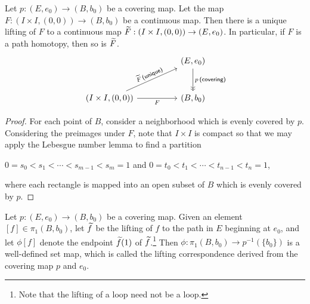 \begin{thm}
    Let $p: (E, e_0)\rightarrow (B, b_0)$ be a covering map.
    Let the map $F: (I\times I, (0, 0))\rightarrow (B, b_0)$ be a continuous map.
    Then there is a unique lifting of $F$ to a continuous map $\widetilde{F}: (I\times I, (0, 0))\rightarrow (E, e_0)$.
    In particular, if $F$ is a path homotopy, then so is $\widetilde{F}$.
    \begin{equation*}
    \begin{tikzcd}[row sep=large, column sep=huge]
        &
        (E, e_0)
        \arrow[d, "p\,\textsf{(covering)}", ->>]
        \\
        (I\times I, (0, 0))
        \arrow[ur, "\wt{F}\,\textsf{(unique)}"sloped]
        \arrow[r, "F"']
        &
        (B, b_0)
    \end{tikzcd}
    \end{equation*}
\end{thm}
\begin{proof}
    For each point of $B$, consider a neighborhood which is evenly covered by $p$.
    Considering the preimages under $F$, note that $I\times I$ is compact so that we may apply the Lebesgue number lemma to find a partition
    \begin{center}
        $0=s_0<s_1<\cdots<s_{m-1}<s_m=1$ and $0=t_0<t_1<\cdots<t_{n-1}<t_n=1$,
    \end{center}
    where each rectangle is mapped into an open subset of $B$ which is evenly covered by $p$.
\end{proof}

\begin{defi}
    Let $p: (E, e_0)\rightarrow (B, b_0)$ be a covering map.
    Given an element $[f]\in\pi_1(B, b_0)$, let $\widetilde{f}$ be the lifting of $f$ to the path in $E$ beginning at $e_0$, and let $\phi[f]$ denote the endpoint $\widetilde{f}(1)$ of $\widetilde{f}$.\footnote{Note that the lifting of a loop need not be a loop.}
    Then $\phi: \pi_1(B, b_0)\rightarrow p^{-1}(\{b_0\})$ is a well-defined set map, which is called the lifting correspondence derived from the covering map $p$ and $e_0$.
\end{defi}

